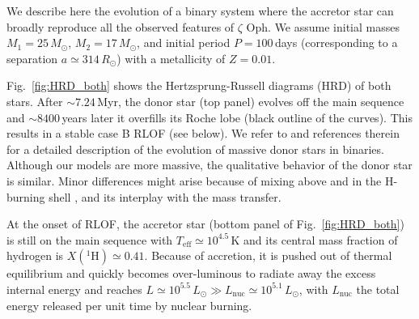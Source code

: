\documentclass[twocolumn,twocolappendix,trackchanges]{aastex63}
\DeclareRobustCommand{\Figref}[1]{Fig.~\ref{#1}}
\newcommand{\zoph}{$\zeta$ Oph}
\begin{document}
We describe here the evolution of a binary system where the accretor
star can broadly reproduce all the observed features of \zoph. We
assume initial masses $M_1=25\,M_\odot$, $M_2=17\,M_\odot$, and initial
period $P=100$\,days (corresponding to a separation
$a\simeq314\,R_\odot$) with a metallicity of $Z=0.01$.

\Figref{fig:HRD_both} shows the Hertzsprung-Russell diagrams (HRD) of
both stars. After
$\sim$$7.24$\,Myr, the donor star (top panel) evolves off the main sequence and
$\sim8400$\,years later it overfills its Roche lobe (black outline of the curves). This results in a stable case B RLOF (see below). We refer to \cite{gotberg:17, klencki:20, laplace:21, blagorodnova:21} and references therein for a detailed description of the evolution of massive donor stars in binaries. Although our models are more massive, the qualitative behavior of the donor star is similar. Minor differences might arise because of mixing above and in the H-burning shell \citep[e.g.,][]{schootemeijer:19, klencki:21}, and its interplay with the mass transfer.

At the onset of RLOF, the accretor star (bottom panel of \Figref{fig:HRD_both}) is still on the main sequence with
$T_\mathrm{eff}\simeq10^{4.5}$\,K and its central mass fraction of hydrogen is $X(^1\mathrm{H})\simeq
0.41$. Because of accretion, it is pushed out of thermal equilibrium and quickly becomes over-luminous to radiate away the excess internal energy and reaches $L\simeq10^{5.5}\,L_\odot\gg
L_\mathrm{nuc}\simeq
10^{5.1}\,L_\odot$, with
$L_\mathrm{nuc}$ the total energy released per unit time by nuclear burning.
\end{document}
